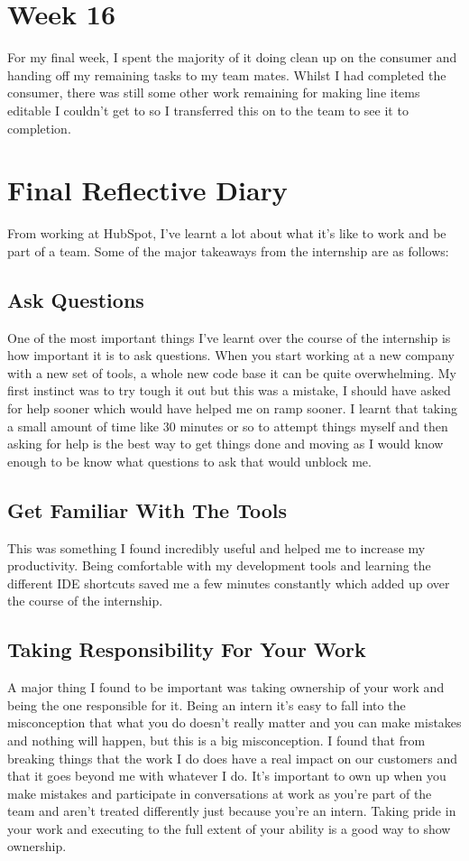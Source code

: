 \section{Week 16}
For my final week, I spent the majority of it doing clean up on the consumer and handing off my remaining tasks to my team mates. Whilst I had completed the consumer, there was still some other work remaining for making line items editable I couldn't get to so I transferred this on to the team to see it to completion. 

\section{Final Reflective Diary}
From working at HubSpot, I've learnt a lot about what it's like to work and be part of a team. Some of the major takeaways from the internship are as follows: 

\subsection{Ask Questions}
One of the most important things I've learnt over the course of the internship is how important it is to ask questions. When you start working at a new company with a new set of tools, a whole new code base it can be quite overwhelming. My first instinct was  to try tough it out but this was a mistake, I should have asked for help sooner which would have helped me on ramp sooner. I learnt that taking a small amount of time like 30 minutes or so to attempt things myself and then asking for help is the best way to get things done and moving as I would know enough to be know what questions to ask that would unblock me.

\subsection{Get Familiar With The Tools}
This was something I found incredibly useful and helped me to increase my productivity. Being comfortable with my development tools and learning the different IDE shortcuts saved me a few minutes constantly which added up over the course of the internship.

\subsection{Taking Responsibility For Your Work}
A major thing I found to be important was taking ownership of your work and being the one responsible for it. Being an intern it's easy to fall into the misconception that what you do doesn't really matter and you can make mistakes and nothing will happen, but this is a big misconception. I found that from breaking things that the work I do does have a real impact on our customers and that it goes beyond me with whatever I do. It's important to own up when you make mistakes and participate in conversations at work as you're part of the team and aren't treated differently just because you're an intern. Taking pride in your work and executing to the full extent of your ability is a good way to show ownership.

